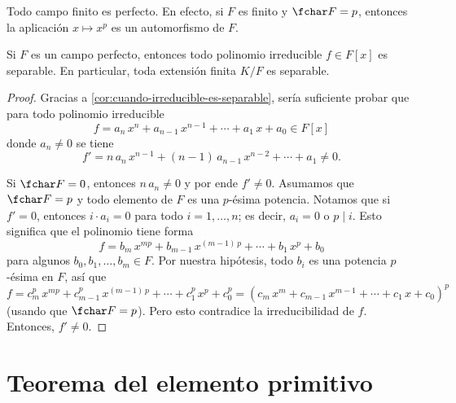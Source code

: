 \begin{ejemplo}
  Todo campo finito es perfecto. En efecto, si $F$ es finito y $\fchar F = p$,
  entonces la aplicación $x \mapsto x^p$ es un automorfismo de $F$.
\end{ejemplo}

\begin{proposicion}
  Si $F$ es un campo perfecto, entonces todo polinomio irreducible $f \in F [x]$
  es separable. En particular, toda extensión finita $K/F$ es separable.

  \begin{proof}
    Gracias a \ref{cor:cuando-irreducible-es-separable}, sería suficiente probar
    que para todo polinomio irreducible
    $$f = a_n\,x^n + a_{n-1}\,x^{n-1} + \cdots + a_1\,x + a_0 \in F [x]$$
    donde $a_n\ne 0$ se tiene
    $$f' = n\,a_n\,x^{n-1} + (n-1)\,a_{n-1}\,x^{n-2} + \cdots + a_1 \ne 0.$$

    Si $\fchar F = 0$, entonces $n\,a_n \ne 0$ y por ende $f' \ne 0$. Asumamos
    que $\fchar F = p$ y todo elemento de $F$ es una $p$-ésima potencia. Notamos
    que si $f' = 0$, entonces $i\cdot a_i = 0$ para todo $i = 1,\ldots,n$; es
    decir, $a_i = 0$ o $p\mid i$. Esto significa que el polinomio tiene forma
    $$f = b_m\,x^{mp} + b_{m-1}\,x^{(m-1)\,p} + \cdots + b_1\,x^p + b_0$$
    para algunos $b_0,b_1,\ldots,b_m \in F$. Por nuestra hipótesis, todo $b_i$ es
    una potencia $p$-ésima en $F$, así que
    \[ f = c_m^p\,x^{mp} + c_{m-1}^p\,x^{(m-1)\,p} + \cdots + c_1^p\,x^p + c_0^p
         = (c_m\,x^m + c_{m-1}\,x^{m-1} + \cdots + c_1\,x + c_0)^p \]
    (usando que $\fchar F = p$). Pero esto contradice la irreducibilidad de
    $f$. Entonces, $f'\ne 0$.
  \end{proof}
\end{proposicion}


\section{Teorema del elemento primitivo}


